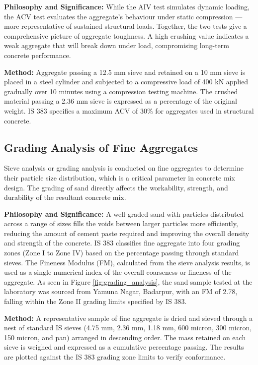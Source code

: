 \par\noindent
\textbf{Philosophy and Significance:} While the AIV test simulates dynamic loading, the ACV test evaluates the aggregate's behaviour under static compression --- more representative of sustained structural loads. Together, the two tests give a comprehensive picture of aggregate toughness. A high crushing value indicates a weak aggregate that will break down under load, compromising long-term concrete performance.

\par\noindent
\textbf{Method:} Aggregate passing a 12.5 mm sieve and retained on a 10 mm sieve is placed in a steel cylinder and subjected to a compressive load of 400 kN applied gradually over 10 minutes using a compression testing machine. The crushed material passing a 2.36 mm sieve is expressed as a percentage of the original weight. IS 383 specifies a maximum ACV of 30\% for aggregates used in structural concrete.

\subsection{Grading Analysis of Fine Aggregates}
\par\noindent
Sieve analysis or grading analysis is conducted on fine aggregates to determine their particle size distribution, which is a critical parameter in concrete mix design. The grading of sand directly affects the workability, strength, and durability of the resultant concrete mix.

\par\noindent
\textbf{Philosophy and Significance:} A well-graded sand with particles distributed across a range of sizes fills the voids between larger particles more efficiently, reducing the amount of cement paste required and improving the overall density and strength of the concrete. IS 383 classifies fine aggregate into four grading zones (Zone I to Zone IV) based on the percentage passing through standard sieves. The Fineness Modulus (FM), calculated from the sieve analysis results, is used as a single numerical index of the overall coarseness or fineness of the aggregate. As seen in Figure \ref{fig:grading_analysis}, the sand sample tested at the laboratory was sourced from Yamuna Nagar, Badarpur, with an FM of 2.78, falling within the Zone II grading limits specified by IS 383.

\par\noindent
\textbf{Method:} A representative sample of fine aggregate is dried and sieved through a nest of standard IS sieves (4.75 mm, 2.36 mm, 1.18 mm, 600 micron, 300 micron, 150 micron, and pan) arranged in descending order. The mass retained on each sieve is weighed and expressed as a cumulative percentage passing. The results are plotted against the IS 383 grading zone limits to verify conformance.

